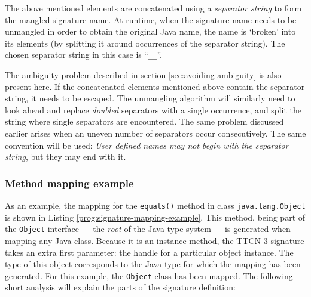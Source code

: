 The above mentioned elements are concatenated using a \emph{separator string}
to form the mangled signature name.
At runtime, when the signature name needs to be unmangled
in order to obtain the original Java name,
the name is `broken' into its elements
(by splitting it around occurrences of the separator string).
The chosen separator string in this case is ``\verb+__+''.

The ambiguity problem described in section \ref{sec:avoiding-ambiguity}
is also present here.
If the concatenated elements mentioned above contain the separator string,
it needs to be escaped.
The unmangling algorithm will similarly need to look ahead
and replace \emph{doubled} separators with a single occurrence,
and split the string where single separators are encountered.
The same problem discussed earlier arises
when an uneven number of separators occur consecutively.
The same convention will be used:
\emph{User defined names may not begin with the separator string},
but they may end with it.


\subsubsection{Method mapping example}
As an example,
the mapping for the \verb=equals()= method in class \verb=java.lang.Object=
is shown in Listing \ref{prog:signature-mapping-example}.
This method, being part of the \verb=Object= interface ---
the \emph{root} of the Java type system ---
is generated when mapping any Java class.
Because it is an instance method,
the \ac{TTCN-3} signature takes an extra first parameter:
the handle for a particular object instance.
The type of this object corresponds to the Java type for which the mapping
has been generated.
For this example, the \verb=Object= class has been mapped.
The following short analysis will explain
the parts of the signature definition:

\begin{program}
\caption{Method mapping example for \texttt{java.lang.Object.equals()}%
	\label{prog:signature-mapping-example}}
\end{program}

